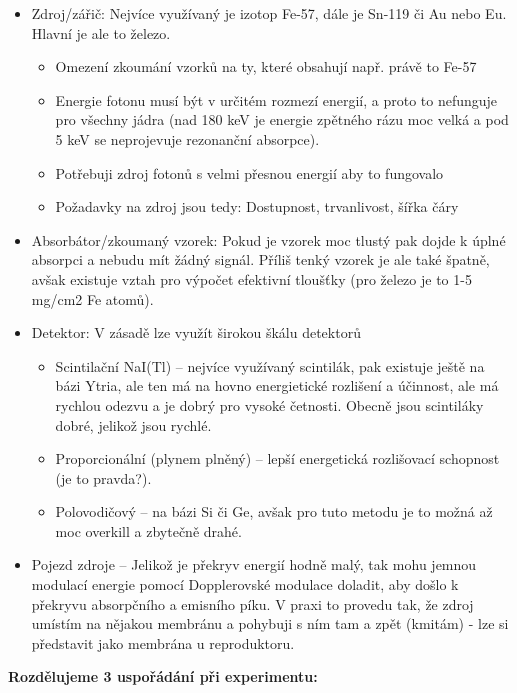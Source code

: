 \begin{itemize}
    \item Zdroj/zářič: Nejvíce využívaný je izotop Fe-57, dále je Sn-119 či Au nebo Eu. Hlavní je ale to železo.
        \begin{itemize}
            \item Omezení zkoumání vzorků na ty, které obsahují např. právě to Fe-57
            \item Energie fotonu musí být v určitém rozmezí energií, a proto to nefunguje pro všechny jádra (nad 180 keV je energie zpětného rázu moc velká a pod 5 keV se neprojevuje rezonanční absorpce).
            \item Potřebuji zdroj fotonů s velmi přesnou energií aby to fungovalo
            \item Požadavky na zdroj jsou tedy: Dostupnost, trvanlivost, šířka čáry
        \end{itemize}
    \item Absorbátor/zkoumaný vzorek: Pokud je vzorek moc tlustý pak dojde k úplné absorpci a nebudu mít žádný signál. Příliš tenký vzorek je ale také špatně, avšak existuje vztah pro výpočet efektivní tloušťky (pro železo je to 1-5 mg/cm2 Fe atomů).
    \item Detektor: V zásadě lze využít širokou škálu detektorů
        \begin{itemize}
            \item Scintilační NaI(Tl) -- nejvíce využívaný scintilák, pak existuje ještě na bázi Ytria, ale ten má na hovno energietické rozlišení a účinnost, ale má rychlou odezvu a je dobrý pro vysoké četnosti. Obecně jsou scintiláky dobré, jelikož jsou rychlé.
            \item Proporcionální (plynem plněný) -- lepší energetická rozlišovací schopnost (je to pravda?).
            \item Polovodičový -- na bázi Si či Ge, avšak pro tuto metodu je to možná až moc overkill a zbytečně drahé.
        \end{itemize}

    \item Pojezd zdroje -- Jelikož je překryv energií hodně malý, tak mohu jemnou modulací energie pomocí Dopplerovské modulace doladit, aby došlo k překryvu absorpčního a emisního píku. V praxi to provedu tak, že zdroj umístím na nějakou membránu a pohybuji s ním tam a zpět (kmitám) - lze si představit jako membrána u reproduktoru.
\end{itemize}

\textbf{Rozdělujeme 3 uspořádání při experimentu:}

